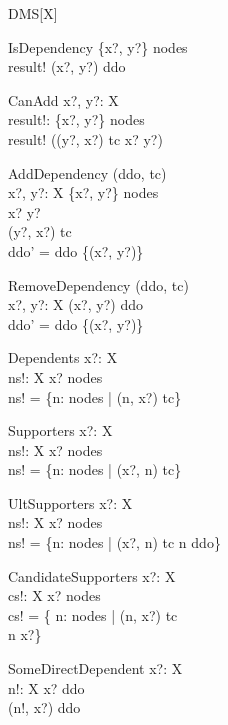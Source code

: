 \begin{class}{DMS}[X]
\begin{schema}{IsDependency}
\where
  \{x?, y?\} \subseteq nodes \\ 
  result! \iff (x?, y?) \in ddo 
\end{schema}
\begin{schema}{CanAdd}
  x?, y?:  X  \\
  result!:  \bool  
\where
  \{x?, y?\} \subseteq nodes \\ 
  result! \iff ((y?, x?) \notin tc \land x? \neq y?)
\end{schema}
\begin{schema}{AddDependency}
  \Delta (ddo, tc)\\
  x?, y?:  X  
\where
  \{x?, y?\} \subseteq nodes \\
  x? \neq y? \\
  (y?, x?) \notin tc \\ 
  ddo' = ddo \cup \{(x?, y?)\}
\end{schema}
\begin{schema}{RemoveDependency}
  \Delta (ddo, tc)\\
  x?, y?:  X  
\where
  (x?, y?) \in ddo \\ 
  ddo' = ddo \setminus \{(x?, y?)\}
\end{schema}
\begin{schema}{Dependents}
  x?:  X  \\
  ns!:  \finset  X  
\where
  x? \in nodes \\ 
  ns! = \{n: nodes | (n, x?) \in tc\}
\end{schema}
\begin{schema}{Supporters}
  x?:  X  \\
  ns!: \finset  X  
\where
  x? \in nodes \\ 
  ns! = \{n: nodes | (x?, n) \in tc\}
\end{schema}
\begin{schema}{UltSupporters}
  x?:  X  \\
  ns!: \finset  X  
\where
  x? \in nodes \\ 
  ns! = \{n: nodes | (x?, n) \in tc \land n \notin  \dom ddo\}
\end{schema}
\begin{schema}{CandidateSupporters}
  x?:  X  \\
  cs!:  \finset  X 
\where
  x? \in nodes \\ 
  cs! = \{ n: nodes | (n, x?) \notin tc \land \\ n \neq x?\}
\end{schema}
\begin{schema}{SomeDirectDependent}
  x?:  X  \\
  n!:  X  
\where
  x? \in  \ran ddo \\ 
  (n!, x?) \in ddo
\end{schema} 
\end{class} 

